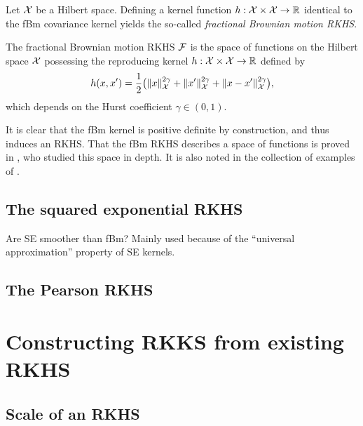 \documentclass[a4paper,showframe,11pt,draft]{report}
\begin{document}

Let ${\mathcal X}$ be a Hilbert space. 
Defining a kernel function $h:{\mathcal X}\times{\mathcal X}\to\mathbb{R}$ identical to the fBm covariance kernel yields the so-called \emph{fractional Brownian motion RKHS}.

\begin{definition}
  The fractional Brownian motion RKHS ${\mathcal F}$ is the space of functions on the Hilbert space ${\mathcal X}$ possessing the reproducing kernel $h:{\mathcal X}\times{\mathcal X}\to\mathbb{R}$ defined by
  \[
    h(x,x') = \frac{1}{2}\big( \lVert x\rVert_{\mathcal X}^{2\gamma} + \lVert x'\rVert_{\mathcal X}^{2\gamma} + \lVert x-x'\rVert_{\mathcal X}^{2\gamma} \big),
  \]
  which depends on the Hurst coefficient $\gamma \in (0,1)$.
\end{definition}

It is clear that the fBm kernel is positive definite by construction, and thus induces an RKHS.
That the fBm RKHS describes a space of functions is proved in \citet{cohen2002}, who studied this space in depth. 
It is also noted in the collection of examples of \citet[pp.71 \& 319]{berlinet2011reproducing}.









\subsection{The squared exponential RKHS}

Are SE smoother than fBm? Mainly used because of the ``universal approximation'' property of SE kernels.

\subsection{The Pearson RKHS}

\section{Constructing RKKS from existing RKHS}

\subsection{Scale of an RKHS}
\end{document}
